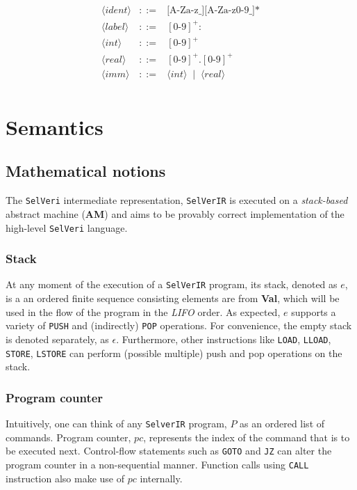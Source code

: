 \documentclass{article}
\begin{document}
\[\begin{array}{rcl}
\langle \mathit{ident} \rangle &::=& \text{[A-Za-z\_][A-Za-z0-9\_]*} \\[6pt]

\langle \mathit{label} \rangle &::=& [0\texttt{-}9]^+ \texttt{:}\\[6pt]

\langle \mathit{int} \rangle &::=& [0\texttt{-}9]^+ \\[6pt]

\langle \mathit{real} \rangle &::=& [0\texttt{-}9]^+\texttt{.}[0\texttt{-}9]^+ \\[6pt]

\langle \mathit{imm} \rangle &::=& \langle \mathit{int} \rangle \;\mid\; \langle \mathit{real} \rangle \\[6pt]

\end{array}
\]

\newpage
\section{Semantics}

\subsection{Mathematical notions}
The \texttt{SelVeri} intermediate representation, \texttt{SelVerIR} is executed on a \textit{stack-based} abstract machine (\textbf{AM}) and aims to be provably correct implementation of the high-level \texttt{SelVeri} language.

\subsubsection{Stack}
At any moment of the execution of a \texttt{SelVerIR} program, its stack, denoted as $e$, is a an ordered finite sequence consisting elements are from \textbf{Val}, which will be used in the flow of the program in the \textit{LIFO} order. As expected, $e$ supports a variety of \texttt{PUSH} and (indirectly) \texttt{POP} operations. For convenience, the empty stack is denoted separately, as $\epsilon$. Furthermore, other instructions like \texttt{LOAD}, \texttt{LLOAD}, \texttt{STORE}, \texttt{LSTORE} can perform (possible multiple) push and pop operations on the stack.

\subsubsection{Program counter}
Intuitively, one can think of any \texttt{SelverIR} program, $P$ as an ordered list of commands. Program counter, $pc$, represents the index of the command that is to be executed next. Control-flow statements such as \texttt{GOTO} and \texttt{JZ} can alter the program counter in a non-sequential manner. Function calls using \texttt{CALL} instruction also make use of $pc$ internally.
\end{document}

